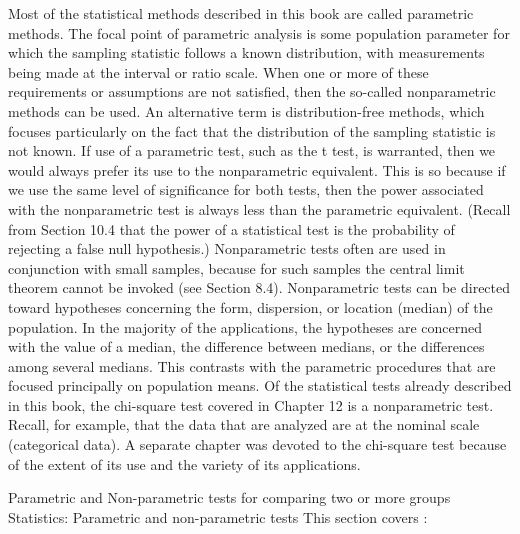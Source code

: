 Most of the statistical methods described in this book are called parametric methods. The focal point of
parametric analysis is some population parameter for which the sampling statistic follows a known distribution,
with measurements being made at the interval or ratio scale. When one or more of these requirements or
assumptions are not satisfied, then the so-called nonparametric methods can be used. An alternative term is
distribution-free methods, which focuses particularly on the fact that the distribution of the sampling statistic is
not known.
If use of a parametric test, such as the t test, is warranted, then we would always prefer its use to the
nonparametric equivalent. This is so because if we use the same level of significance for both tests, then the
power associated with the nonparametric test is always less than the parametric equivalent. (Recall from
Section 10.4 that the power of a statistical test is the probability of rejecting a false null hypothesis.)
Nonparametric tests often are used in conjunction with small samples, because for such samples the central
limit theorem cannot be invoked (see Section 8.4).
Nonparametric tests can be directed toward hypotheses concerning the form, dispersion, or location
(median) of the population. In the majority of the applications, the hypotheses are concerned with the value of a
median, the difference between medians, or the differences among several medians. This contrasts with the
parametric procedures that are focused principally on population means.
Of the statistical tests already described in this book, the chi-square test covered in Chapter 12 is a
nonparametric test. Recall, for example, that the data that are analyzed are at the nominal scale (categorical
data). A separate chapter was devoted to the chi-square test because of the extent of its use and the variety of its
applications.


Parametric and Non-parametric tests for comparing two or more groups
Statistics: Parametric and non-parametric tests
This section covers :

